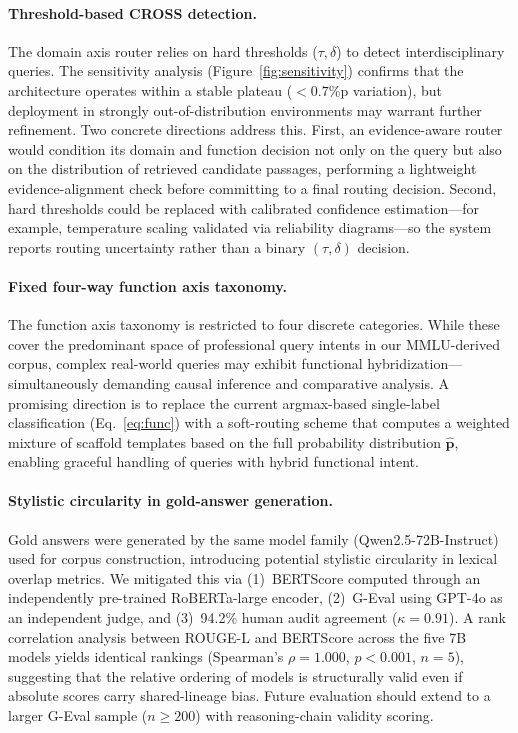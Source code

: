 \documentclass[a4paper,fleql]{cas-sc}
\begin{document}
\paragraph{Threshold-based CROSS detection.}
The domain axis router relies on hard thresholds ($\tau, \delta$) to detect
interdisciplinary queries. The sensitivity analysis (Figure~\ref{fig:sensitivity})
confirms that the architecture operates within a stable plateau ($< 0.7$\%p
variation), but deployment in strongly out-of-distribution environments may
warrant further refinement. Two concrete directions address this. First, an evidence-aware router would
condition its domain and function decision not only on the query but also on
the distribution of retrieved candidate passages, performing a lightweight
evidence-alignment check before committing to a final routing decision.
Second, hard thresholds could be replaced with calibrated confidence
estimation---for example, temperature scaling validated via reliability
diagrams---so the system reports routing uncertainty rather than a binary
$(\tau, \delta)$ decision.

\paragraph{Fixed four-way function axis taxonomy.}
The function axis taxonomy is restricted to four discrete categories.
While these cover the predominant space of professional query intents in
our MMLU-derived corpus, complex real-world queries may exhibit functional
hybridization---simultaneously demanding causal inference and comparative
analysis. A promising direction is to replace the current argmax-based
single-label classification (Eq.~\ref{eq:func}) with a soft-routing scheme
that computes a weighted mixture of scaffold templates based on the full
probability distribution $\hat{\mathbf{p}}$, enabling graceful handling of
queries with hybrid functional intent.

\paragraph{Stylistic circularity in gold-answer generation.}
Gold answers were generated by the same model family (Qwen2.5-72B-Instruct)
used for corpus construction, introducing potential stylistic circularity in
lexical overlap metrics. We mitigated this via (1)~BERTScore computed through
an independently pre-trained RoBERTa-large encoder, (2)~G-Eval using GPT-4o
as an independent judge, and (3)~94.2\% human audit agreement ($\kappa = 0.91$).
A rank correlation analysis between ROUGE-L and BERTScore across the five 7B
models yields identical rankings (Spearman's $\rho = 1.000$, $p < 0.001$,
$n = 5$), suggesting that the relative ordering of models is structurally
valid even if absolute scores carry shared-lineage bias. Future evaluation
should extend to a larger G-Eval sample ($n{\geq}200$) with reasoning-chain
validity scoring.
\end{document}
